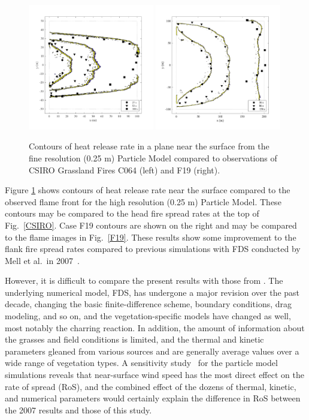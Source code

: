 \documentclass[journal,article,atmosphere,submit,moreauthors,pdftex]{Definitions_Review_Process/mdpi}
\begin{document}
\begin{figure}[ht]
\includegraphics[width=0.49\textwidth]{figures/Case_C064_flame_position.pdf}
\includegraphics[width=0.49\textwidth]{figures/Case_F19_flame_position.pdf}
\caption{Contours of heat release rate in a plane near the surface from the fine resolution (0.25 m) Particle Model compared to observations of CSIRO Grassland Fires C064 (left) and F19 (right).}
\label{fig:CaseF19_contours}
\end{figure}

Figure \ref{fig:CaseF19_contours} shows contours of heat release rate near the surface compared to the observed flame front for the high resolution (0.25 m) Particle Model.  These contours may be compared to the head fire spread rates at the top of Fig.~\ref{CSIRO}.  Case F19 contours are shown on the right and may be compared to the flame images in Fig.~\ref{F19}.  These results show some improvement to the flank fire spread rates compared to previous simulations with FDS conducted by Mell et al.~in 2007~\cite{Mell:IJWF2007}.

However, it is difficult to compare the present results with those from \cite{Mell:IJWF2007}. The underlying numerical model, FDS, has undergone a major revision over the past decade, changing the basic finite-difference scheme, boundary conditions, drag modeling, and so on, and the vegetation-specific models have changed as well, most notably the charring reaction. In addition, the amount of information about the grasses and field conditions is limited, and the thermal and kinetic parameters gleaned from various sources and are generally average values over a wide range of vegetation types. A sensitivity study~\cite{McGrattan:CI2017} for the particle model simulations reveals that near-surface wind speed has the most direct effect on the rate of spread (RoS), and the combined effect of the dozens of thermal, kinetic, and numerical parameters would certainly explain the difference in RoS between the 2007 results and those of this study. 
\end{document}
